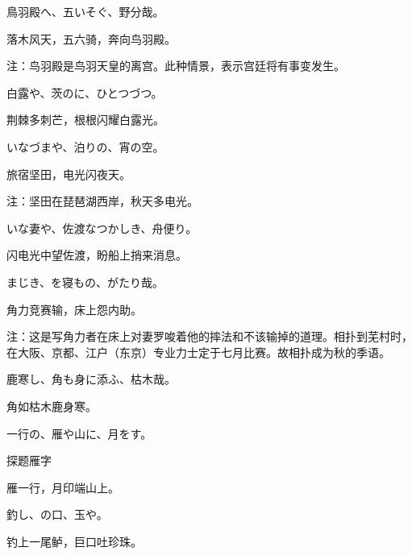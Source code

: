 \begin{haiku}
    {\FH 鳥羽殿へ、五いそぐ、野分哉。}

    {\FK 落木风天，五六骑，奔向鸟羽殿。}

    {\FT 注：鸟羽殿是鸟羽天皇的离宫。此种情景，表示宫廷将有事变发生。}
\end{haiku}

\begin{haiku}
    {\FH 白露や、茨のに、ひとつづつ。}

    {\FK 荆棘多刺芒，根根闪耀白露光。}
\end{haiku}

\begin{haiku}
    {\FH いなづまや、泊りの、宵の空。}

    {\FK 旅宿坚田，电光闪夜天。}

    {\FT 注：坚田在琵琶湖西岸，秋天多电光。}
\end{haiku}

\begin{haiku}
    {\FH いな妻や、佐渡なつかしき、舟便り。}

    {\FK 闪电光中望佐渡，盼船上捎来消息。}
\end{haiku}

\begin{haiku}
    {\FH {}まじき、を寝もの、がたり哉。}

    {\FK 角力竞赛输，床上怨内助。}

    {\FT 注：这是写角力者在床上对妻罗唆着他的摔法和不该输掉的道理。相扑到芜村时，在大阪、京都、江户（东京）专业力士定于七月比赛。故相扑成为秋的季语。}
\end{haiku}

\begin{haiku}
    {\FH 鹿寒し、角も身に添ふ、枯木哉。}

    {\FK 角如枯木鹿身寒。}
\end{haiku}

\begin{haiku}
    {\FH 一行の、雁や山に、月をす。}

    {\FK 探题雁字}

    {\FK 雁一行，月印端山上。}
\end{haiku}

\begin{haiku}
    {\FH 釣し、の口、玉や。}

    {\FK 钓上一尾鲈，巨口吐珍珠。}
\end{haiku}

